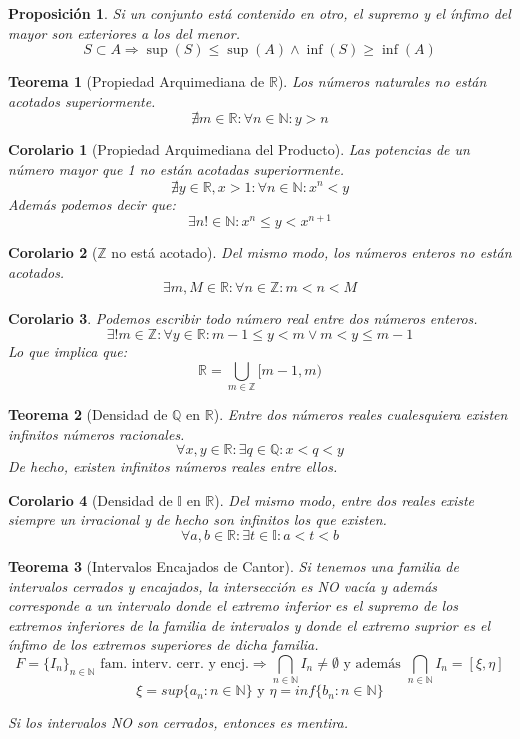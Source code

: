 \documentclass[10pt,a4paper,openright]{book}
\newtheorem{teorema}{Teorema}[chapter]
\newtheorem{corolario}{Corolario}[teorema]
\newtheorem{proposicion}{Proposición}[chapter]
\begin{document}
\begin{proposicion}
Si un conjunto está contenido en otro, el supremo y el ínfimo del mayor son exteriores a los del menor.
$$S\subset A\Rightarrow \sup(S)\leq \sup(A)\wedge \inf(S)\geq \inf(A)$$
\end{proposicion}

\begin{teorema}[Propiedad Arquimediana de $\mathbb R$]
Los números naturales no están acotados superiormente.
$$\nexists m\in \mathbb R: \forall n\in \mathbb N: y>n$$
\end{teorema}

\begin{corolario}[Propiedad Arquimediana del Producto]
Las potencias de un número mayor que 1 no están acotadas superiormente.
$$\nexists y\in \mathbb R, x>1: \forall n\in \mathbb N: x^n<y$$
Además podemos decir que:
$$\exists n!\in \mathbb N : x^n\leq y< x^{n+1}$$
\end{corolario}

\begin{corolario}[$\mathbb Z$ no está acotado]
Del mismo modo, los números enteros no están acotados.
$$\exists m,M\in \mathbb R: \forall n\in \mathbb Z: m<n<M$$
\end{corolario}

\begin{corolario}
Podemos escribir todo número real entre dos números enteros.
$$\exists! m\in \mathbb Z: \forall y\in \mathbb R: m-1\leq y<m \vee m<y\leq m-1$$
Lo que implica que:
$$\mathbb R =\bigcup_{m\in \mathbb Z}[m-1,m)$$
\end{corolario}

\begin{teorema}[Densidad de $\mathbb Q$ en $\mathbb R$]
Entre dos números reales cualesquiera existen infinitos números racionales.
$$\forall x,y\in \mathbb R: \exists q\in \mathbb Q: x<q<y$$
De hecho, existen infinitos números reales entre ellos.
\end{teorema}

\begin{corolario}[Densidad de $\mathbb I$ en $\mathbb R$]
Del mismo modo, entre dos reales existe siempre un irracional y de hecho son infinitos los que existen.
$$\forall a,b\in \mathbb R: \exists t\in \mathbb I: a<t<b$$
\end{corolario}

\begin{teorema}[Intervalos Encajados de Cantor]
Si tenemos una familia de intervalos cerrados y encajados, la intersección es NO vacía y además corresponde a un intervalo donde el extremo inferior es el supremo de los extremos inferiores de la familia de intervalos y donde el extremo suprior es el ínfimo de los extremos superiores de dicha familia.
$$F=\{I_n\}_{n\in \mathbb N} \mbox{ fam. interv. cerr. y encj.}\Rightarrow \bigcap_{n\in \mathbb N}I_n\neq \emptyset \mbox{ y además }\bigcap_{n\in \mathbb N} I_n=[\xi, \eta]$$
$$\xi=sup\{a_n: n\in \mathbb N\}\mbox{ y }\eta=inf\{b_n: n\in \mathbb N\}$$

Si los intervalos NO son cerrados, entonces es mentira.
\end{teorema}
\end{document}
